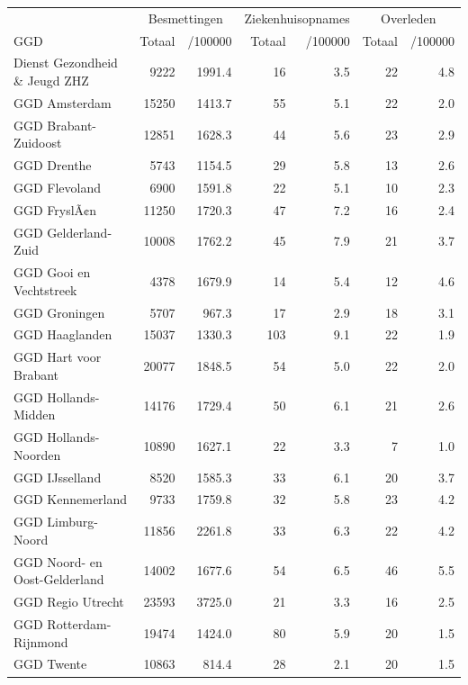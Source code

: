 \documentclass[
  english,
  man,floatsintext]{apa6}
\begin{document}
\begin{table}
\centering\begingroup\fontsize{10}{12}\selectfont

\begin{threeparttable}
\begin{tabular}{lrrrrrr}
\toprule
\multicolumn{1}{c}{ } & \multicolumn{2}{c}{Besmettingen} & \multicolumn{2}{c}{Ziekenhuisopnames} & \multicolumn{2}{c}{Overleden} \\
\cmidrule(l{3pt}r{3pt}){2-3} \cmidrule(l{3pt}r{3pt}){4-5} \cmidrule(l{3pt}r{3pt}){6-7}
GGD & Totaal & /100000 & Totaal & /100000 & Totaal & /100000\\
\midrule
Dienst Gezondheid \& Jeugd ZHZ & 9222 & 1991.4 & 16 & 3.5 & 22 & 4.8\\
GGD Amsterdam & 15250 & 1413.7 & 55 & 5.1 & 22 & 2.0\\
GGD Brabant-Zuidoost & 12851 & 1628.3 & 44 & 5.6 & 23 & 2.9\\
GGD Drenthe & 5743 & 1154.5 & 29 & 5.8 & 13 & 2.6\\
GGD Flevoland & 6900 & 1591.8 & 22 & 5.1 & 10 & 2.3\\
GGD FryslÃ¢n & 11250 & 1720.3 & 47 & 7.2 & 16 & 2.4\\
GGD Gelderland-Zuid & 10008 & 1762.2 & 45 & 7.9 & 21 & 3.7\\
GGD Gooi en Vechtstreek & 4378 & 1679.9 & 14 & 5.4 & 12 & 4.6\\
GGD Groningen & 5707 & 967.3 & 17 & 2.9 & 18 & 3.1\\
GGD Haaglanden & 15037 & 1330.3 & 103 & 9.1 & 22 & 1.9\\
GGD Hart voor Brabant & 20077 & 1848.5 & 54 & 5.0 & 22 & 2.0\\
GGD Hollands-Midden & 14176 & 1729.4 & 50 & 6.1 & 21 & 2.6\\
GGD Hollands-Noorden & 10890 & 1627.1 & 22 & 3.3 & 7 & 1.0\\
GGD IJsselland & 8520 & 1585.3 & 33 & 6.1 & 20 & 3.7\\
GGD Kennemerland & 9733 & 1759.8 & 32 & 5.8 & 23 & 4.2\\
GGD Limburg-Noord & 11856 & 2261.8 & 33 & 6.3 & 22 & 4.2\\
GGD Noord- en Oost-Gelderland & 14002 & 1677.6 & 54 & 6.5 & 46 & 5.5\\
GGD Regio Utrecht & 23593 & 3725.0 & 21 & 3.3 & 16 & 2.5\\
GGD Rotterdam-Rijnmond & 19474 & 1424.0 & 80 & 5.9 & 20 & 1.5\\
GGD Twente & 10863 & 814.4 & 28 & 2.1 & 20 & 1.5\\

\end{tabular}
\end{threeparttable}
\end{table}
\end{document}

